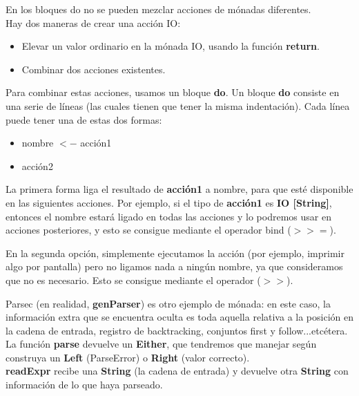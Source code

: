 En los bloques do no se pueden mezclar acciones de m\'onadas diferentes.\\

Hay dos maneras de crear una acci\'on IO:

\begin{itemize}
  \item Elevar un valor ordinario en la m\'onada IO, usando la funci\'on \textbf{return}.
  \item Combinar dos acciones existentes.
\end{itemize}

Para combinar estas acciones, usamos un bloque \textbf{do}. Un bloque \textbf{do} consiste en una serie de l\'ineas (las cuales tienen que tener la misma indentaci\'on). Cada l\'inea puede tener una de estas dos formas:

\begin{itemize}
  \item nombre $<-$ acci\'on1
  \item acci\'on2
\end{itemize}

La primera forma liga el resultado de \textbf{acci\'on1} a nombre, para que est\'e disponible en las siguientes acciones. Por ejemplo, si el tipo de \textbf{acci\'on1} es \textbf{IO [String]}, entonces el nombre estar\'a ligado en todas las acciones y lo podremos usar en acciones posteriores, y esto se consigue mediante el operador bind ($>>=$).

En la segunda opci\'on, simplemente ejecutamos la acci\'on (por ejemplo, imprimir algo por pantalla) pero no ligamos nada a ning\'un nombre, ya que consideramos que no es necesario. Esto se consigue mediante el operador ($>>$).

Parsec (en realidad, \textbf{genParser}) es otro ejemplo de m\'onada: en este caso, la informaci\'on extra que se encuentra oculta es toda aquella relativa a la posici\'on en la cadena de entrada, registro de backtracking, conjuntos first y follow...etc\'etera.\\

La funci\'on \textbf{parse} devuelve un \textbf{Either}, que tendremos que manejar seg\'un construya un \textbf{Left} (ParseError) o \textbf{Right} (valor correcto).\\

\textbf{readExpr} recibe una \textbf{String} (la cadena de entrada) y devuelve otra \textbf{String} con informaci\'on de lo que haya parseado.\\

